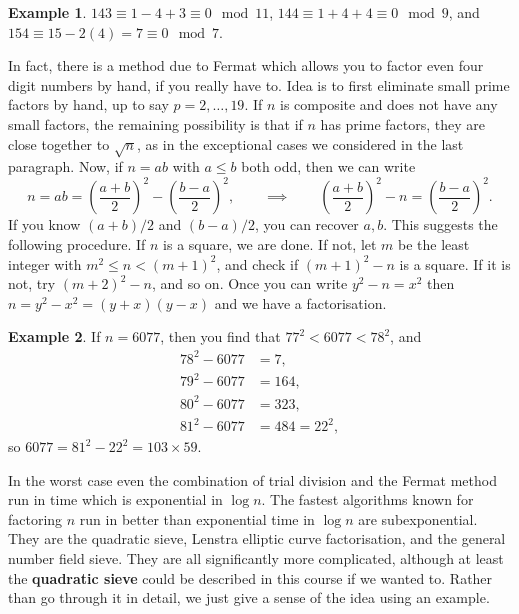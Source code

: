 \documentclass{article}
\newcommand{\rb}[1]{\left( #1 \right)}
\theoremstyle{definition}\newtheorem{definition}{Definition}
\theoremstyle{definition}\newtheorem{remark}[definition]{Remark}
\theoremstyle{definition}\newtheorem*{example}{Example}
\theoremstyle{definition}\newtheorem*{note}{Note}
\begin{document}
\begin{example}
$ 143 \equiv 1 - 4 + 3 \equiv 0 \mod 11 $, $ 144 \equiv 1 + 4 + 4 \equiv 0 \mod 9 $, and $ 154 \equiv 15 - 2\rb{4} = 7 \equiv 0 \mod 7 $.
\end{example}


In fact, there is a method due to Fermat which allows you to factor even four digit numbers by hand, if you really have to. Idea is to first eliminate small prime factors by hand, up to say $ p = 2, \dots, 19 $. If $ n $ is composite and does not have any small factors, the remaining possibility is that if $ n $ has prime factors, they are close together to $ \sqrt{n} $, as in the exceptional cases we considered in the last paragraph. Now, if $ n = ab $ with $ a \le b $ both odd, then we can write
$$ n = ab = \rb{\dfrac{a + b}{2}}^2 - \rb{\dfrac{b - a}{2}}^2, \qquad \implies \qquad \rb{\dfrac{a + b}{2}}^2 - n = \rb{\dfrac{b - a}{2}}^2. $$
If you know $ \rb{a + b} / 2 $ and $ \rb{b - a} / 2 $, you can recover $ a, b $. This suggests the following procedure. If $ n $ is a square, we are done. If not, let $ m $ be the least integer with $ m^2 \le n < \rb{m + 1}^2 $, and check if $ \rb{m + 1}^2 - n $ is a square. If it is not, try $ \rb{m + 2}^2 - n $, and so on. Once you can write $ y^2 - n = x^2 $ then $ n = y^2 - x^2 = \rb{y + x}\rb{y - x} $ and we have a factorisation.

\begin{example}
If $ n  = 6077 $, then you find that $ 77^2 < 6077 < 78^2 $, and
\begin{align*}
78^2 - 6077 & = 7, \\
79^2 - 6077 & = 164, \\
80^2 - 6077 & = 323, \\
81^2 - 6077 & = 484 = 22^2,
\end{align*}
so $ 6077 = 81^2 - 22^2 = 103 \times 59 $.
\end{example}

In the worst case even the combination of trial division and the Fermat method run in time which is exponential in $ \log n $. The fastest algorithms known for factoring $ n $ run in better than exponential time in $ \log n $ are subexponential. They are the quadratic sieve, Lenstra elliptic curve factorisation, and the general number field sieve. They are all significantly more complicated, although at least the \textbf{quadratic sieve} could be described in this course if we wanted to. Rather than go through it in detail, we just give a sense of the idea using an example.
\end{document}
